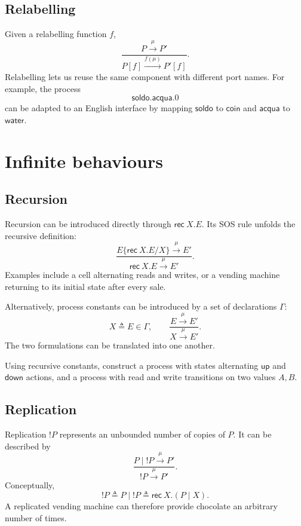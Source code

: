 \documentclass[a4paper]{article}
\newcommand{\trans}[1]{\xrightarrow{#1}}
\begin{document}
\subsection{Relabelling}

Given a relabelling function \(f\),
\[
    \frac{P\trans{\mu}P'}{P[f]\trans{f(\mu)}P'[f]}.
\]
Relabelling lets us reuse the same component with different port names.
For example, the process
\[
    \mathsf{soldo}.\mathsf{acqua}.0
\]
can be adapted to an English interface by mapping \(\mathsf{soldo}\) to \(\mathsf{coin}\) and \(\mathsf{acqua}\) to \(\mathsf{water}\).

\section{Infinite behaviours}

\subsection{Recursion}

Recursion can be introduced directly through \(\mathsf{rec}\ X.E\).
Its SOS rule unfolds the recursive definition:
\[
    \frac{
        E\{\mathsf{rec}\ X.E/X\}\trans{\mu}E'
    }{
        \mathsf{rec}\ X.E\trans{\mu}E'
    }.
\]
Examples include a cell alternating reads and writes, or a vending machine returning to its initial state after every sale.

Alternatively, process constants can be introduced by a set of declarations \(\Gamma\):
\[
    X\triangleq E\in\Gamma,
    \qquad
    \frac{E\trans{\mu}E'}{X\trans{\mu}E'}.
\]
The two formulations can be translated into one another.

\begin{snippetexercise}{}
    Using recursive constants, construct a process with states alternating \(\mathsf{up}\) and \(\mathsf{down}\) actions, and a process with read and write transitions on two values \(A,B\).
\end{snippetexercise}

\subsection{Replication}

Replication \(!P\) represents an unbounded number of copies of \(P\).
It can be described by
\[
    \frac{P\mid!P\trans{\mu}P'}{!P\trans{\mu}P'}.
\]
Conceptually,
\[
    !P
    \triangleq
    P\mid!P
    \triangleq
    \mathsf{rec}\ X.(P\mid X).
\]
A replicated vending machine can therefore provide chocolate an arbitrary number of times.
\end{document}
